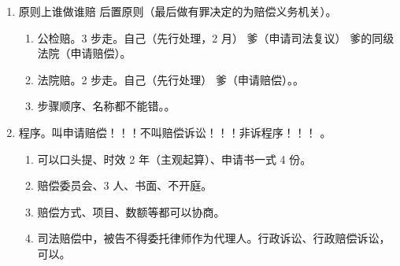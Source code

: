 \begin{enumerate}
\begin{enumerate}
\begin{kk}{没罪关了就要赔，有罪关了也白关；免罪关了分前后，赔后不赔前}
\begin{enumerate}
\begin{enumerate}
                          \end{enumerate}
                    \item 关。实际、羁押、期间。。
                    \item 就要赔。。
                  \end{enumerate}
                  \tcblower
                  \begin{enumerate}
                    \item 免罪！！显著轻，过时效，特赦告诉和死掉。！！
                    \item 前后。以生效、判决、生效为界。注意这里会挖坑，多个判决、上诉之类的。
                    \item {}。
                  \end{enumerate}
                \end{kk}
          \item 原则上谁做谁赔 \yjt 后置原则（最后做有罪决定的为赔偿义务机关）。
                \begin{enumerate}
                  \item 公检赔。3 步走。自己（先行处理，2 月） \yjt 爹（申请司法复议） \yjt 爹的同级法院（申请赔偿）。
                  \item 法院赔。2 步走。自己（先行处理） \yjt 爹（申请赔偿）。。
                  \item 步骤顺序、名称都不能错。。
                \end{enumerate}
          \item 程序。叫申请赔偿！！！不叫赔偿诉讼！！！非诉程序！！！
                。
                \begin{enumerate}
                  \item 可以口头提、时效 2 年（主观起算）、申请书一式 4 份。
                  \item 赔偿委员会、3 人、书面、不开庭。
                  \item 赔偿方式、项目、数额等都可以协商。
                  \item 司法赔偿中，被告不得委托律师作为代理人。行政诉讼、行政赔偿诉讼，可以。

\end{enumerate}
\end{enumerate}
\end{enumerate}

